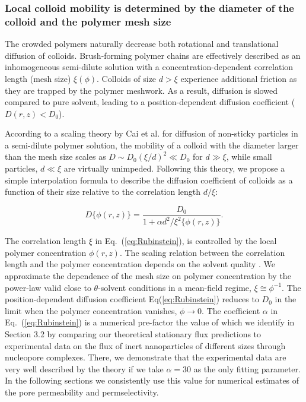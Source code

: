 \documentclass[12pt, a4paper]{article}
\begin{document}
\subsubsection{Local colloid mobility is determined by the diameter of the colloid and the polymer mesh size}

The crowded polymers naturally decrease both rotational \cite{Fu2017} and translational \cite{Stewart1998} diffusion of colloids.
Brush-forming polymer chains are effectively described as an inhomogeneous semi-dilute solution with a concentration-dependent correlation length (mesh size) $\xi(\phi)$.
Colloids of size $d > \xi$ experience additional friction as they are trapped by the polymer meshwork.
As a result, diffusion is slowed compared to pure solvent, leading to a position-dependent diffusion coefficient ($D(r,z) < D_0$).

According to a scaling theory by Cai et al.  \cite{Cai2011} for diffusion of non-sticky particles in a semi-dilute polymer solution, the mobility of a colloid with the diameter larger than the mesh size scales as $D\sim D_0 (\xi/d)^2\ll D_0$ for $d\gg \xi$, while small particles, $d\ll \xi$ are virtually unimpeded. Following this theory, we propose a simple interpolation formula to describe the diffusion coefficient of colloids as a function of their size relative to the correlation length $d / \xi$:

\begin{equation}
    D\{\phi(r,z)\} = \frac{D_0}{1+\alpha d^2/\xi^{2}\{\phi(r,z)\}}.
    \label{eq:Rubinstein}
\end{equation}

The correlation length $\xi$ in Eq.~(\ref{eq:Rubinstein}), is controlled by the local polymer concentration $\phi(r,z)$.
The scaling relation between the correlation length and the polymer concentration depends on the solvent quality \cite{DeGennes1979}.
We approximate the dependence of the mesh size on polymer concentration by the power-law valid close to $\theta$-solvent conditions in a mean-field regime, $\xi\cong \phi^{-1}$. The position-dependent diffusion coefficient Eq(\ref{eq:Rubinstein}) reduces to $D_0$ in the limit when the polymer concentration vanishes, $\phi\rightarrow 0$.
The coefficient $\alpha$ in Eq.~(\ref{eq:Rubinstein}) is a numerical pre-factor the value of which we identify in Section 3.2 by comparing our theoretical stationary flux predictions to experimental data on the flux of inert nanoparticles of different sizes through  nucleopore complexes. There, we demonstrate that the experimental data are very well described by the theory if we take $\alpha=30$ as the only fitting parameter. In the following sections we consistently use this value for numerical estimates of the pore permeability and permselectivity.  
\end{document}
